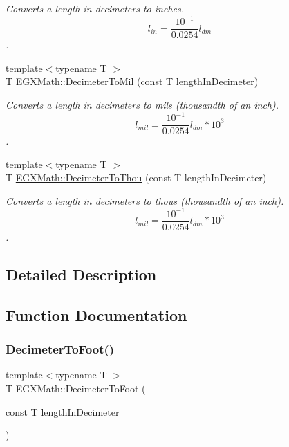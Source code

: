 \begin{DoxyCompactItemize}
\begin{DoxyCompactList}\small\item\em Converts a length in decimeters to inches. \[ l_{in}= \frac{10^{-1}}{0.0254} l_{dm} \]. \end{DoxyCompactList}\item 
{\footnotesize template$<$typename T $>$ }\\T \mbox{\hyperlink{group___e_g_x_math-_conversions-_length_conversions-_decimeter-_imperial_gad2ce3f2de1fdda0216bdb56c4844b5e5}{E\+G\+X\+Math\+::\+Decimeter\+To\+Mil}} (const T length\+In\+Decimeter)
\begin{DoxyCompactList}\small\item\em Converts a length in decimeters to mils (thousandth of an inch). \[ l_{mil}= \frac{10^{-1}}{0.0254} l_{dm} * 10^{3} \]. \end{DoxyCompactList}\item 
{\footnotesize template$<$typename T $>$ }\\T \mbox{\hyperlink{group___e_g_x_math-_conversions-_length_conversions-_decimeter-_imperial_gafc294e549fcdd1c43545ca9624abcafb}{E\+G\+X\+Math\+::\+Decimeter\+To\+Thou}} (const T length\+In\+Decimeter)
\begin{DoxyCompactList}\small\item\em Converts a length in decimeters to thous (thousandth of an inch). \[ l_{mil}= \frac{10^{-1}}{0.0254} l_{dm} * 10^{3} \]. \end{DoxyCompactList}\end{DoxyCompactItemize}


\subsection{Detailed Description}


\subsection{Function Documentation}
\mbox{\label{group___e_g_x_math-_conversions-_length_conversions-_decimeter-_imperial_gaf86c80f8ce1e5ab6113a2a912c1f446e}} 
\subsubsection{\texorpdfstring{Decimeter\+To\+Foot()}{DecimeterToFoot()}}
{\footnotesize\ttfamily template$<$typename T $>$ \\
T E\+G\+X\+Math\+::\+Decimeter\+To\+Foot (\begin{DoxyParamCaption}\item[{const T}]{length\+In\+Decimeter }\end{DoxyParamCaption})}



